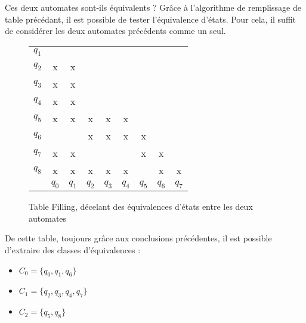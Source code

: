 	 Ces deux automates sont-ils équivalents ? Grâce à l'algorithme de remplissage de table précédant, il est possible de tester l'équivalence d'états. Pour cela, il suffit de considérer les deux automates précédents comme un seul.
	 
	 \begin{figure}[H]
	 	\centering
	 	\begin{tabular}{ccccccccc}
	 		\cline{2-2}
	 		\multicolumn{1}{c|}{$q_1$}&\multicolumn{1}{c|}{} &&&&&&&\\
	 		\cline{2-3}
	 		\multicolumn{1}{c|}{$q_2$}&\multicolumn{1}{c|}{x} &\multicolumn{1}{c|}{x}&&&&&&\\
	 		\cline{2-4}
	 		\multicolumn{1}{c|}{$q_3$}&\multicolumn{1}{c|}{x}&\multicolumn{1}{c|}{x}&\multicolumn{1}{c|}{}&&&&&\\
	 		\cline{2-5}
	 		\multicolumn{1}{c|}{$q_4$}&\multicolumn{1}{c|}{x}&\multicolumn{1}{c|}{x}&\multicolumn{1}{c|}{}&\multicolumn{1}{c|}{}&&&&\\
	 		\cline{2-6}
	 		\multicolumn{1}{c|}{$q_5$}&\multicolumn{1}{c|}{x}&\multicolumn{1}{c|}{x}&\multicolumn{1}{c|}{x}&\multicolumn{1}{c|}{x}&\multicolumn{1}{c|}{x}&&&\\
	 		\cline{2-7}
	 		\multicolumn{1}{c|}{$q_6$}&\multicolumn{1}{c|}{}&\multicolumn{1}{c|}{}&\multicolumn{1}{c|}{x}&\multicolumn{1}{c|}{x}&\multicolumn{1}{c|}{x}&\multicolumn{1}{c|}{x}&&\\
	 		\cline{2-8}
	 		\multicolumn{1}{c|}{$q_7$}&\multicolumn{1}{c|}{x}&\multicolumn{1}{c|}{x}&\multicolumn{1}{c|}{}&\multicolumn{1}{c|}{}&\multicolumn{1}{c|}{}&\multicolumn{1}{c|}{x}&\multicolumn{1}{c|}{x}&\\
	 		\cline{2-9}
	 		\multicolumn{1}{c|}{$q_8$}&\multicolumn{1}{c|}{x}&\multicolumn{1}{c|}{x}&\multicolumn{1}{c|}{x}&\multicolumn{1}{c|}{x}&\multicolumn{1}{c|}{x}&\multicolumn{1}{c|}{}&\multicolumn{1}{c|}{x}&\multicolumn{1}{c|}{x}\\
	 		\cline{2-9}
	 		\multicolumn{1}{c}{} & $q_0$& $q_1$ & $q_2$ & $q_3$ & $q_4$ & $q_5$ & $q_6$ & $q_7$\\
	 		
	 	\end{tabular}
	 	\caption{Table Filling, décelant des équivalences d'états entre les deux automates}\label{fig:tahi}
	 \end{figure}
	 
	 De cette table, toujours grâce aux conclusions précédentes, il est possible d'extraire des classes d'équivalences : 
	 \begin{itemize}
	 	\item $C_0 = \{q_0, q_1, q_6\}$
	 	\item $C_1 = \{q_2, q_3, q_4, q_7\}$
	 	\item $C_2 = \{q_5, q_8\}$
	 \end{itemize}
	 
